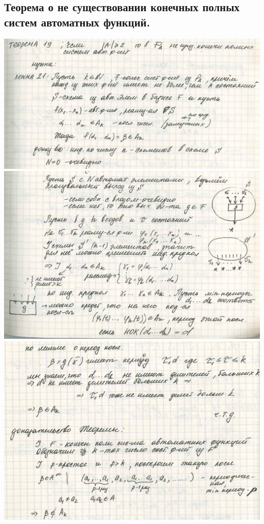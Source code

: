 \documentclass[12pt]{article}
\begin{document}
\subsection{Теорема о не существовании конечных полных систем автоматных функций.}
	\includegraphics[width=500pt]{40}\\
	\includegraphics[width=500pt]{41}\\
	\includegraphics[width=500pt]{42}\\
\end{document}
